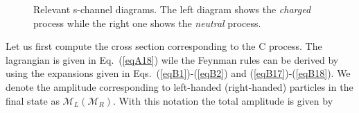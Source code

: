 \documentclass[aps,preprint,tightenlines,floatfix,superscriptaddress,nofootinbib,showpacs]{revtex4-1}
\begin{document}
\begin{center}
\begin{figure}[H]
\centering
\hspace*{0.2\textwidth}
\caption{Relevant s-channel diagrams. The left diagram shows the \emph{charged} process while the right one shows the \emph{neutral} process.}
\label{fig3}
\end{figure}
\end{center}
\par
Let us first compute the cross section corresponding to the C process. The lagrangian is given in Eq.~(\ref{eqA18}) wile the Feynman rules can be derived by using the expansions given in Eqs.~(\ref{eqB1})-(\ref{eqB2}) and (\ref{eqB17})-(\ref{eqB18}). We denote the amplitude corresponding to left-handed (right-handed) particles in the final state as $\mathcal{M}_L(\mathcal{M}_R)$. With this notation the total amplitude is given by
\end{document}
